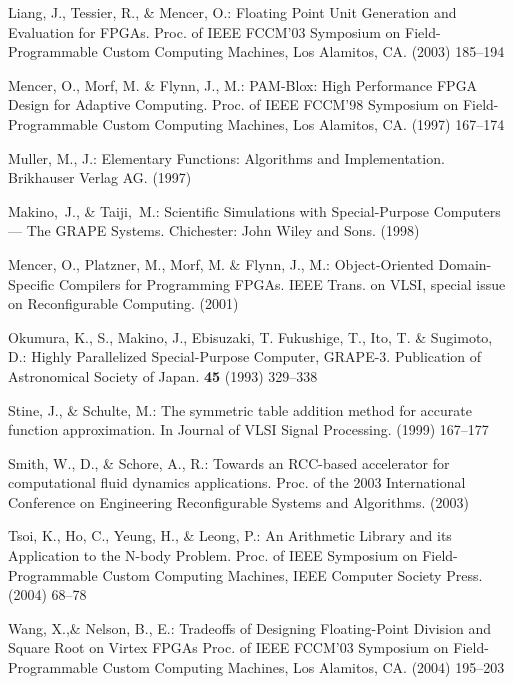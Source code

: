 \documentclass{llncs}
\begin{document}
\begin{thebibliography}{}
Liang, J., Tessier, R., \& Mencer, O.:
Floating Point Unit Generation and Evaluation for FPGAs.
Proc. of IEEE FCCM'03 Symposium on Field-Programmable Custom Computing Machines, Los Alamitos, CA.
(2003) 185--194

Mencer, O., Morf, M. \& Flynn, J., M.:
PAM-Blox: High Performance FPGA Design for Adaptive Computing.
Proc. of IEEE FCCM'98 Symposium on Field-Programmable Custom Computing Machines, Los Alamitos, CA.
(1997) 167--174

Muller, M., J.:
Elementary Functions: Algorithms and Implementation.
Brikhauser Verlag AG.
(1997)


Makino,~J., \& Taiji,~M.:
Scientific Simulations with Special-Purpose Computers --- The GRAPE Systems.
Chichester: John Wiley and Sons.
(1998)

Mencer, O., Platzner, M., Morf, M. \& Flynn, J., M.:
Object-Oriented Domain-Specific Compilers for Programming FPGAs.
IEEE Trans. on VLSI, special issue on Reconfigurable Computing.
(2001)


Okumura, K., S., Makino, J., Ebisuzaki, T. Fukushige, T., Ito, T. \& Sugimoto, D.:
Highly Parallelized Special-Purpose Computer, GRAPE-3.
Publication of Astronomical Society of Japan.
{\bfseries 45} (1993) 329--338


Stine, J., \& Schulte, M.:
The symmetric table addition method for accurate function approximation.
In Journal of VLSI Signal Processing.
(1999) 167--177

Smith, W., D., \& Schore, A., R.:
Towards an RCC-based accelerator for computational fluid dynamics applications.
Proc. of the 2003 International Conference on Engineering Reconfigurable Systems and Algorithms.
(2003)

Tsoi, K., Ho, C., Yeung, H., \& Leong, P.:
An Arithmetic Library and its Application to the N-body Problem.
Proc. of IEEE Symposium on Field-Programmable Custom Computing Machines, IEEE Computer Society Press.
(2004) 68--78

Wang, X.,\& Nelson, B., E.:
Tradeoffs of Designing Floating-Point Division and Square Root on Virtex FPGAs
Proc. of IEEE FCCM'03 Symposium on Field-Programmable Custom Computing Machines, Los Alamitos, CA.
(2004) 195--203


\end{thebibliography}
\end{document}
